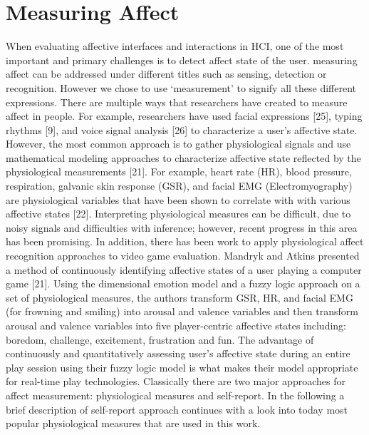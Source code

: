 \section{Measuring Affect}
When evaluating affective interfaces and interactions in HCI, one of the most important and primary challenges is to detect affect state of the user. measuring affect can be addressed under different titles such as sensing, detection or recognition. However we chose to use `measurement' to signify all these different expressions. There are multiple ways that researchers have created to measure affect in people. For example, researchers have used facial expressions [25], typing rhythms [9], and voice signal analysis [26] to characterize a user’s affective state. However, the most common approach is to gather physiological signals and use mathematical modeling approaches to characterize affective state reflected by the physiological measurements [21]. For example, heart rate (HR), blood pressure, respiration, galvanic skin response (GSR), and facial EMG (Electromyography) are physiological variables that have been shown to correlate with with various affective states [22]. Interpreting physiological measures can be difficult, due to noisy signals and difficulties with inference; however, recent progress in this area has been promising. In addition, there has been work to apply physiological affect recognition approaches to video game evaluation. Mandryk and Atkins presented a method of continuously identifying affective states of a user playing a computer game [21]. Using the dimensional emotion model and a fuzzy logic approach on a set of physiological measures, the authors transform GSR, HR, and facial EMG (for frowning and smiling) into arousal and valence variables and then transform arousal and valence variables into five player-centric affective states including: boredom, challenge, excitement, frustration and fun. The advantage of continuously and quantitatively assessing user's affective state during an entire play session using their fuzzy logic model is what makes their model appropriate for real-time play technologies. Classically there are two major approaches for affect measurement: physiological measures and self-report. In the following a brief description of self-report approach continues with a look into today most popular physiological measures that are used in this work.

